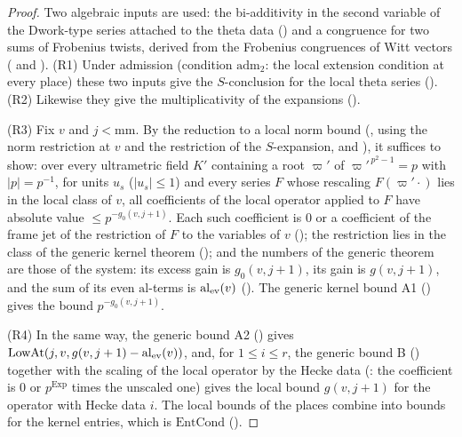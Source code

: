 \begin{proof}
Two algebraic inputs are used: the bi-additivity in the second variable of the Dwork-type series attached to the theta
data () and a congruence for two sums of Frobenius twists,
derived from the Frobenius congruences of Witt vectors
( and ).
(R1) Under admission (condition $\mathrm{adm}_2$: the local extension condition at every place) these two inputs give
the $S$-conclusion for the local theta series
(). (R2) Likewise they give the
multiplicativity of the expansions
().

(R3) Fix $v$ and $j<\mathrm{mm}$. By the reduction to a local norm bound
(, using the norm restriction at $v$ and the restriction of
the $S$-expansion,  and ),
it suffices to show: over every ultrametric field $K'$ containing a root $\varpi'$ of $\varpi'^{\,p^2-1}=p$ with $|p|=p^{-1}$, for
units $u_s$ ($|u_s|\le1$) and every series $F$ whose rescaling $F(\varpi'\cdot)$ lies in the local class of $v$, all
coefficients of the local operator applied to $F$ have absolute value $\le p^{-g_0(v,j+1)}$. Each such coefficient is $0$
or a coefficient of the frame jet of the restriction of $F$ to the variables of $v$
(); the restriction lies in the class of the generic kernel
theorem (); and the numbers of the generic theorem are
those of the system: its excess gain is $g_0(v,j+1)$, its gain is $g(v,j+1)$, and the sum of its even
$\mathrm{al}$-terms is $\mathrm{al}_{\rm ev}(v)$ (). The generic
kernel bound A1 () gives the bound $p^{-g_0(v,j+1)}$.

(R4) In the same way, the generic bound A2
() gives $\mathrm{LowAt}(j,v,g(v,j+1)-\mathrm{al}_{\rm ev}(v))$,
and, for $1\le i\le r$, the generic bound B () together
with the scaling of the local operator by the Hecke data
(: the coefficient is $0$ or $p^{\mathrm{Exp}}$ times the
unscaled one) gives the local bound $g(v,j+1)$ for the operator with Hecke data $i$. The local bounds of the places
combine into bounds for the kernel entries, which is $\mathrm{EntCond}$
().
\end{proof}

